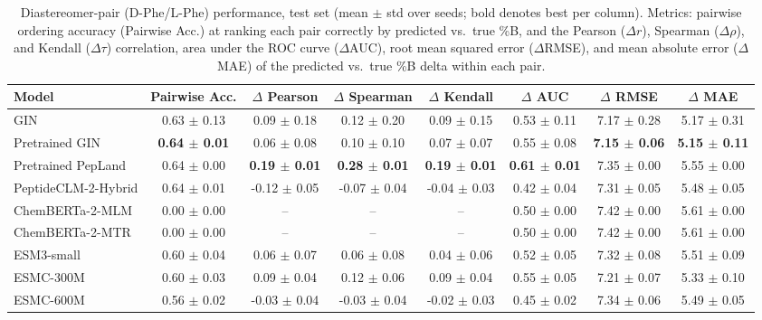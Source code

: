 \begin{table}[htbp]
  \caption{Diastereomer-pair (D-Phe/L-Phe) performance, test set (mean $\pm$ std over seeds; bold denotes best per column). Metrics: pairwise ordering accuracy (Pairwise Acc.) at ranking each pair correctly by predicted vs.\ true \%B, and the Pearson ($\Delta r$), Spearman ($\Delta\rho$), and Kendall ($\Delta\tau$) correlation, area under the ROC curve ($\Delta$AUC), root mean squared error ($\Delta$RMSE), and mean absolute error ($\Delta$MAE) of the predicted vs.\ true \%B delta within each pair.}
  \label{tab:diastereomer_performance}
  \centering
  \scriptsize
  \setlength{\tabcolsep}{6pt}
  \begin{tabular}{lccccccc}
    \toprule
    \textbf{Model} & \textbf{Pairwise Acc.} & \textbf{$\Delta$ Pearson} & \textbf{$\Delta$ Spearman} & \textbf{$\Delta$ Kendall} & \textbf{$\Delta$ AUC} & \textbf{$\Delta$ RMSE} & \textbf{$\Delta$ MAE} \\
    \midrule
    GIN & 0.63 $\pm$ 0.13 & 0.09 $\pm$ 0.18 & 0.12 $\pm$ 0.20 & 0.09 $\pm$ 0.15 & 0.53 $\pm$ 0.11 & 7.17 $\pm$ 0.28 & 5.17 $\pm$ 0.31 \\
    Pretrained GIN & \textbf{0.64 $\pm$ 0.01} & 0.06 $\pm$ 0.08 & 0.10 $\pm$ 0.10 & 0.07 $\pm$ 0.07 & 0.55 $\pm$ 0.08 & \textbf{7.15 $\pm$ 0.06} & \textbf{5.15 $\pm$ 0.11} \\
    Pretrained PepLand & 0.64 $\pm$ 0.00 & \textbf{0.19 $\pm$ 0.01} & \textbf{0.28 $\pm$ 0.01} & \textbf{0.19 $\pm$ 0.01} & \textbf{0.61 $\pm$ 0.01} & 7.35 $\pm$ 0.00 & 5.55 $\pm$ 0.00 \\
    PeptideCLM-2-Hybrid & 0.64 $\pm$ 0.01 & -0.12 $\pm$ 0.05 & -0.07 $\pm$ 0.04 & -0.04 $\pm$ 0.03 & 0.42 $\pm$ 0.04 & 7.31 $\pm$ 0.05 & 5.48 $\pm$ 0.05 \\
    ChemBERTa-2-MLM & 0.00 $\pm$ 0.00 & -- & -- & -- & 0.50 $\pm$ 0.00 & 7.42 $\pm$ 0.00 & 5.61 $\pm$ 0.00 \\
    ChemBERTa-2-MTR & 0.00 $\pm$ 0.00 & -- & -- & -- & 0.50 $\pm$ 0.00 & 7.42 $\pm$ 0.00 & 5.61 $\pm$ 0.00 \\
    ESM3-small & 0.60 $\pm$ 0.04 & 0.06 $\pm$ 0.07 & 0.06 $\pm$ 0.08 & 0.04 $\pm$ 0.06 & 0.52 $\pm$ 0.05 & 7.32 $\pm$ 0.08 & 5.51 $\pm$ 0.09 \\
    ESMC-300M & 0.60 $\pm$ 0.03 & 0.09 $\pm$ 0.04 & 0.12 $\pm$ 0.06 & 0.09 $\pm$ 0.04 & 0.55 $\pm$ 0.05 & 7.21 $\pm$ 0.07 & 5.33 $\pm$ 0.10 \\
    ESMC-600M & 0.56 $\pm$ 0.02 & -0.03 $\pm$ 0.04 & -0.03 $\pm$ 0.04 & -0.02 $\pm$ 0.03 & 0.45 $\pm$ 0.02 & 7.34 $\pm$ 0.06 & 5.49 $\pm$ 0.05 \\

\end{tabular}
\end{table}
